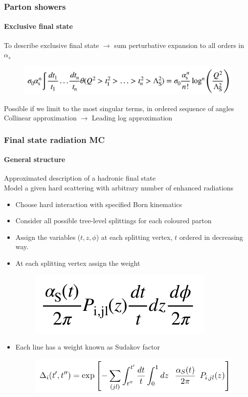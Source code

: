 \documentclass[aspectratio=43]{beamer}
\begin{document}
\begin{frame}
	
	\frametitle{Parton showers}
	\framesubtitle{Exclusive final state}
	
	\footnotesize To describe exclusive final state $\rightarrow$ sum perturbative expansion to all orders in $\alpha_s$ \\
	
	\begin{figure}
		\includegraphics[width = 9 cm]{plots/exclusive_ll.png}
	\end{figure}
	
	\footnotesize Possible if we limit to the most singular terms, in ordered sequence of angles \\
	\color{red} Collinear approximation $\longrightarrow$ Leading log approximation

\end{frame}

\begin{frame}

	\frametitle{Final state radiation MC}
	\framesubtitle{General structure}
	
	\footnotesize Approximated description of a hadronic final state \\
	\footnotesize Model a given hard scattering with arbitrary number of enhanced radiations

	\begin{itemize} 
		\item Choose hard interaction with specified Born kinematics
		\item Consider all possible tree-level splittings for each coloured parton
		\item Assign the variables ($t, z, \phi$) at each splitting vertex, $t$ ordered in decreasing way.
		\item At each splitting vertex assign the weight 
		\begin{figure}
			\includegraphics[width = 2.5 cm]{plots/AP_weight.png}
		\end{figure}
		\item Each line has a weight known as Sudakov factor
		\begin{figure}
			\includegraphics[width = 7 cm]{plots/sudakov.png}
		\end{figure}
	\end{itemize}

\end{frame}
\end{document}
